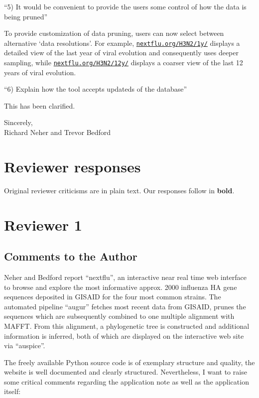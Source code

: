 \documentclass[11pt,oneside,letterpaper]{article}
\begin{document}
``5) It would be convenient to provide the users some control of how the data is being pruned''

To provide customization of data pruning, users can now select between alternative `data resolutions'. For example, \href{http://nextflu.org/H3N2/1y/}{\texttt{nextflu.org/H3N2/1y/}} displays a detailed view of the last year of viral evolution and consequently uses deeper sampling, while \href{http://nextflu.org/H3N2/12y/}{\texttt{nextflu.org/H3N2/12y/}} displays a coarser view of the last 12 years of viral evolution.

``6) Explain how the tool accepts updateds of the database''

This has been clarified.

Sincerely,\\
Richard Neher and Trevor Bedford

\restoregeometry

\newpage

\section*{Reviewer responses}

Original reviewer criticisms are in plain text.  Our responses follow in \textbf{bold}.  


\section*{Reviewer 1}

\subsection*{Comments to the Author}

Neher and Bedford report ``nextflu'', an interactive near real time web interface to browse and explore the most informative approx. 2000 influenza HA gene sequences deposited in GISAID for the four most common strains. The automated pipeline ``augur'' fetches most recent data from GISAID, prunes the sequences which are subsequently combined to one multiple alignment with MAFFT. From this alignment, a phylogenetic tree is constructed and additional information is inferred, both of which are displayed on the interactive web site via ``auspice''.

The freely available Python source code is of exemplary structure and quality, the website is well documented and clearly structured. Nevertheless, I want to raise some critical comments regarding the application note as well as the application itself:
\end{document}
